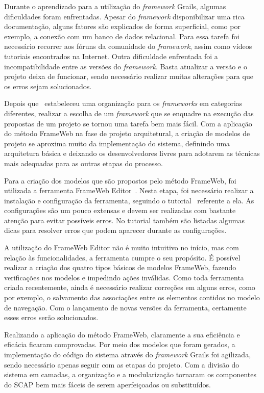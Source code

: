 Durante o aprendizado para a utilização do \textit{framework} Grails, algumas dificuldades foram enfrentadas. Apesar do \textit{framework} disponibilizar uma rica documentação, alguns fatores são explicados de forma superficial, como por exemplo, a conexão com um banco de dados relacional. Para essa tarefa foi necessário recorrer aos fóruns da comunidade do \textit{framework}, assim como vídeos tutoriais encontrados na Internet. Outra dificuldade enfrentada foi a incompatibilidade entre as versões do \textit{framework}. Basta atualizar a versão e o projeto deixa de funcionar, sendo necessário realizar muitas alterações para que os erros sejam solucionados.

Depois que~ estabeleceu uma organização para os \textit{frameworks} em categorias diferentes, realizar a escolha de um \textit{framework} que se enquadre na execução das propostas de um projeto se tornou uma tarefa bem mais fácil. Com a aplicação do método FrameWeb na fase de projeto arquitetural, a criação de modelos de projeto se aproxima muito da implementação do sistema, definindo uma arquitetura básica e deixando os desenvolvedores livres para adotarem as técnicas mais adequadas para as outras etapas do processo.

Para a criação dos modelos que são propostos pelo método FrameWeb, foi utilizada a ferramenta FrameWeb Editor~\cite{campos-souza:webmedia17}. Nesta etapa, foi necessário realizar a instalação e configuração da ferramenta, seguindo o tutorial~\cite{souza:ftt21} referente a ela. As configurações são um pouco extensas e devem ser realizadas com bastante atenção para evitar possíveis erros. No tutorial também são listadas algumas dicas para resolver erros que podem aparecer durante as configurações.

A utilização do FrameWeb Editor não é muito intuitivo no início, mas com relação às funcionalidades, a ferramenta cumpre o seu propósito. É possível realizar a criação dos quatro tipos básicos de modelos FrameWeb, fazendo verificações nos modelos e impedindo ações inválidas. Como toda ferramenta criada recentemente, ainda é necessário realizar correções em alguns erros, como por exemplo, o salvamento das associações entre os elementos contidos no modelo de navegação. Com o lançamento de novas versões da ferramenta, certamente esses erros serão solucionados.

Realizando a aplicação do método FrameWeb, claramente a sua eficiência e eficácia ficaram comprovadas. Por meio dos modelos que foram gerados, a implementação do código do sistema através do \textit{framework} Grails foi agilizada, sendo necessário apenas seguir com as etapas do projeto. Com a divisão do sistema em camadas, a organização e a modularização tornaram os componentes do SCAP bem mais fáceis de serem aperfeiçoados ou substituídos.

